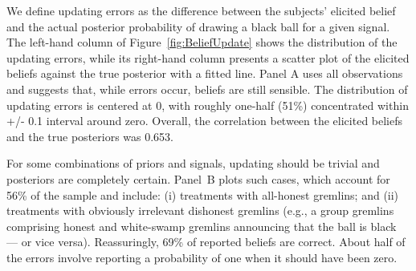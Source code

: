 \documentclass[12pt,a4paper]{article}
\begin{document}
\begin{figure}[H]
	\hfill
	\hfill
\end{figure}

We define updating errors as the difference between the subjects' elicited belief and the actual posterior probability of drawing a black ball for a given signal.  The left-hand column of Figure~\ref{fig:BeliefUpdate} shows the distribution of the updating errors, while its right-hand column presents a scatter plot of the elicited beliefs against the true posterior with a fitted line.
Panel A uses all observations and suggests that, while errors occur, beliefs are still sensible. The distribution of updating errors is centered at 0, with roughly one-half (51\%) concentrated within +/- 0.1 interval around zero. Overall, the correlation between the elicited beliefs and the true posteriors was 0.653.  

For some combinations of priors and signals, updating should be trivial and posteriors are completely certain.  
Panel~B plots such cases, which account for 56\% of the sample and include: (i) treatments with all-honest gremlins; and (ii) treatments with obviously irrelevant dishonest gremlins (e.g., a group gremlins comprising honest and white-swamp gremlins announcing that the ball is black --- or vice versa). Reassuringly, 69\% of reported beliefs are correct. About half of the errors involve reporting a probability of one when it should have been zero.
\end{document}
